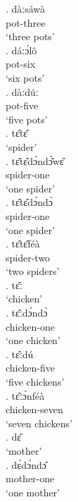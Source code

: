 \documentclass{assets/fieldnotes}
\begin{document}
\ex. dàːsáwà\\
pot-three\\
`three pots'\\

\ex. dáːɔ́lô\\
pot-six\\
`six pots'\\

\ex. dàːdúː\\
pot-five\\
`five pots'\\


\ex. tɛ̂tɛ̂\\
    `spider'\\

\ex. tɛ̂tɛ̂dɔ́ndɔ̀̆wɛ̂\\
spider-one\\
`one spider' \\

\ex. tɛ̂tɛ̂dɔ́ndɔ̀\\
spider-one\\
`one spider' \\

\ex. tɛ̂tɛ̂féà\\
spider-two\\
`two spiders'\\
    
\ex. tɛ̂ː\\
    `chicken'\\

 \ex. tɛ̂ːdɔ́ndɔ̀\\
 chicken-one\\
`one chicken'\\

\ex. tɛ̂ːdú\\
chicken-five\\
`five chickens'\\

\ex. tɛ̂ːɔ́nféà\\
chicken-seven\\
`seven chickens'\\

\ex. dɛ̂\\
`mother' \\

 \ex. dɛ́dɔ́ndɔ̂\\
  mother-one\\
`one mother'\\
\end{document}
